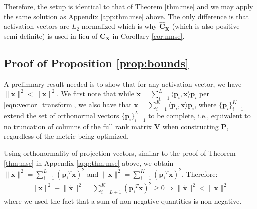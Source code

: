\documentclass{article}
\theoremstyle{plain}
\begin{document}
Therefore, the setup is identical to that of Theorem \ref{thm:mse} and we may apply the same solution as Appendix \ref{app:thm:mse} above. The only difference is that activation vectors are $L_2$-normalized which is why $\hat{\mathbf{C}}_{\mathbf{X}}$ (which is also positive semi-definite) is used in lieu of $\mathbf{C}_{\mathbf{X}}$ in Corollary \ref{cor:nmse}.

\subsection{Proof of Proposition \ref{prop:bounds}}
\label{app:prop:bounds}
A prelimnary result needed is to show that for any activation vector, we have $\lVert \tilde{\mathbf{x}} \rVert^2<\lVert \mathbf{x} \rVert^2$. We first note that while $\tilde{\mathbf{x}}=\sum_{i=1}^L\langle\mathbf{p}_i,\mathbf{x}\rangle\mathbf{p}_i$ per \eqref{eqn:vector_transform}, we also have that $\mathbf{x}=\sum_{i=1}^K\langle\mathbf{p}_i,\mathbf{x}\rangle\mathbf{p}_i$, where $\{\mathbf{p}_i\}_{i=1}^K$ extend the set of orthonormal vectors $\{\mathbf{p}_i\}_{i=1}^L$ to be complete, i.e., equivalent to no truncation of columns of the full rank matrix $\mathbf{V}$ when constructing $\mathbf{P}$, regardless of the metric being optimized.

Using orthonormality of projection vectors, similar to the proof of Theorem \ref{thm:mse} in Appendix \ref{app:thm:mse} above, we obtain $\lVert\tilde{\mathbf{x}}\rVert^2=\sum_{i=1}^L\left(\mathbf{p_i}^T\mathbf{x}\right)^2$ and $\lVert\mathbf{x}\rVert^2=\sum_{i=1}^K\left(\mathbf{p_i}^T\mathbf{x}\right)^2$. Therefore:
\begin{align*}
    \lVert\mathbf{x}\rVert^2 - \lVert\tilde{\mathbf{x}}\rVert^2 = \sum_{i=L+1}^K\left(\mathbf{p_i}^T\mathbf{x}\right)^2 \geq 0 \Rightarrow \lVert \tilde{\mathbf{x}} \rVert^2<\lVert \mathbf{x} \rVert^2
\end{align*}
where we used the fact that a sum of non-negative quantities is non-negative.
\end{document}
